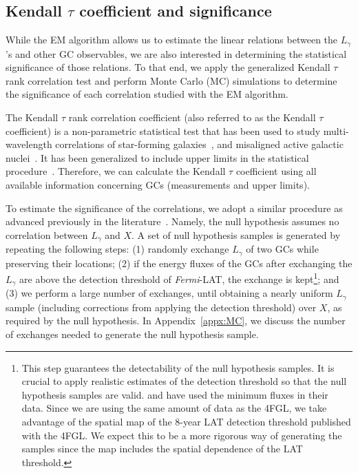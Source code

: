 \documentclass[doublespace,draft,nopageskip]{VTthesis} %
\begin{document}
\subsection{Kendall $\tau$ coefficient and significance}\label{sec:kendall}

While the EM algorithm allows us to estimate the linear relations between the $L_\gamma$'s and other GC observables, we are also interested in determining the statistical significance of those relations. To that end, we apply the generalized Kendall $\tau$ rank correlation test and perform Monte Carlo (MC) simulations to determine the significance of each correlation studied with the EM algorithm. 

The Kendall $\tau$ rank correlation coefficient (also referred to as the Kendall $\tau$ coefficient) is a non-parametric statistical test that has been used to study multi-wavelength correlations of star-forming galaxies~\citep{2012ApJ...755..164A,2020ApJ...894...88A}, and misaligned active galactic nuclei~\citep{2014ApJ...780..161D}. It has been generalized to include upper limits in the statistical procedure~\citep{2012ApJ...755..164A}. Therefore, we can calculate the Kendall $\tau$ coefficient using all available information concerning GCs (measurements and upper limits).

To estimate the significance of the correlations, we adopt a similar procedure as advanced previously in the literature~\citep{2012ApJ...755..164A}. Namely, the null hypothesis assumes no correlation between $L_\gamma$ and $X$. A set of null hypothesis samples is generated by repeating the following steps: (1) randomly exchange $L_\gamma$ of two GCs while preserving their locations; (2) if the energy fluxes of the GCs after exchanging the $L_\gamma$ are above the detection threshold of \textit{Fermi}-LAT, the exchange is kept\footnote{This step guarantees the detectability of the null hypothesis samples. It is crucial to apply realistic estimates of the detection threshold so that the null hypothesis samples are valid. \citet{2012ApJ...755..164A} and \citet{2020ApJ...894...88A} have used the minimum fluxes in their data. Since we are using the same amount of data as the 4FGL, we take advantage of the spatial map of the 8-year LAT detection threshold published with the 4FGL. We expect this to be a more rigorous way of generating the samples since the map includes the spatial dependence of the LAT threshold.}; and (3) we perform a large number of exchanges, until obtaining a nearly uniform $L_\gamma$ sample (including corrections from applying the detection threshold) over $X$, as required by the null hypothesis. In Appendix~\ref{appx:MC}, we discuss the number of exchanges needed to generate the null hypothesis sample.
\end{document}
